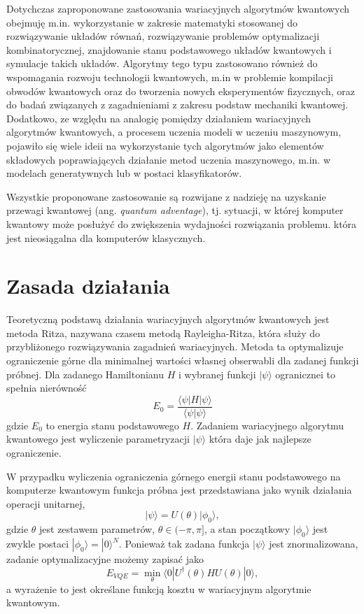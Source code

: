 \documentclass[a4paper,11pt]{article}
\newcommand{\ang}[1]{(ang. \emph{#1})}
\newcommand{\ket}[1]{| #1 \rangle}
\newcommand{\bra}[1]{\langle #1 |}
\newcommand{\braket}[2]{\bra{#2}{#1}\rangle}
\begin{document}
Dotychczas zaproponowane zastosowania wariacyjnych algorytmów kwantowych obejmuję m.in. wykorzystanie w zakresie matematyki stosowanej do rozwiązywanie układów równań, rozwiązywanie problemów optymalizacji kombinatorycznej, znajdowanie stanu podstawowego układów kwantowych i symulacje takich układów. Algorytmy tego typu zastosowano również do wspomagania rozwoju technologii kwantowych, m.in w problemie kompilacji obwodów kwantowych oraz do tworzenia nowych eksperymentów fizycznych, oraz do badań związanych z zagadnieniami z zakresu podstaw mechaniki kwantowej. Dodatkowo, ze względu na analogię pomiędzy działaniem wariacyjnych algorytmów kwantowych, a procesem uczenia modeli w uczeniu maszynowym, pojawiło się wiele ideii na wykorzystanie tych algorytmów jako elementów składowych poprawiających działanie metod uczenia maszynowego, m.in. w modelach generatywnych lub w postaci klasyfikatorów.

Wszystkie proponowane zastosowanie są rozwijane z nadzieję na uzyskanie przewagi kwantowej \ang{quantum adventage}, tj. sytuacji, w której komputer kwantowy może posłużyć do zwiększenia wydajności rozwiązania problemu. która jest nieosiągalna dla komputerów klasycznych.



\section{Zasada działania}\label{zasada-dzialania}

Teoretyczną podstawą działania wariacyjnych algorytmów kwantowych jest metoda Ritza, nazywana czasem metodą Rayleigha-Ritza, która służy do przybliżonego rozwiązywania zagadnień wariacyjnych. Metoda ta optymalizuje ograniczenie górne dla minimalnej wartości własnej obserwabli dla zadanej funkcji próbnej. Dla zadanego Hamiltonianu $H$ i wybranej funkcji $\ket{\psi}$ ogranicznei to spełnia nierówność
\begin{equation}
	E_0 = \frac{\bra{\psi} H \ket{\psi}}{\braket{\psi}{\psi}}
\end{equation}
gdzie $E_0$ to energia stanu podstawowego $H$. Zadaniem wariacyjnego algorytmu kwantowego jest wyliczenie parametryzacji  $\ket{\psi}$ która daje jak najlepsze ograniczenie.

W przypadku wyliczenia ograniczenia górnego energii stanu podstawowego na komputerze kwantowym funkcja próbna jest przedstawiana jako wynik działania operacji unitarnej, 
\begin{equation}
	\ket{\psi} = U(\theta) \ket{\phi_0},
\end{equation}
gdzie $\theta$ jest zestawem parametrów, $\theta\in(-\pi,\pi]$, a stan początkowy $\ket{\phi_0}$ jest zwykle postaci $\ket{\phi_0}=\ket{0}^N$. Ponieważ tak zadana funkcja $\ket{\psi}$ jest znormalizowana, zadanie optymalizacyjne możemy zapisać jako
\begin{equation}
E_{VQE} = \min_\theta \bra{0} U^\dagger(\theta) H U(\theta)\ket{0},
\end{equation}
a wyrażenie to jest określane funkcją kosztu w wariacyjnym algorytmie kwantowym.
\end{document}

